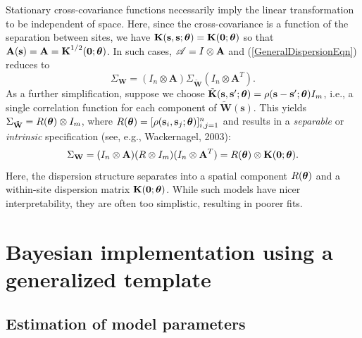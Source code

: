 \documentclass[a4paper]{article}
\newcommand{\btheta}{ \mbox{\boldmath $ \theta $} }
\newcommand{\bzero}{\textbf{0}}
\newcommand{\bA}{\textbf{A}}
\newcommand{\bK}{\textbf{K}}
\newcommand{\bs}{\textbf{s}}
\newcommand{\bW}{\textbf{W}}
\begin{document}
Stationary cross-covariance functions necessarily imply the linear
transformation to be independent of space. Here, since the
cross-covariance is a function of the separation between sites, we
have $\bK(\bs,\bs;\btheta) = \bK(\bzero;\btheta)$ so that
$\bA(\bs)=\bA=\bK^{1/2}(\bzero;\btheta)$. In such cases, ${\cal
A}=I\otimes \bA$ and (\ref{GeneralDispersionEqn}) reduces to
\begin{equation}\label{StationaryDispersionEqn} \Sigma_{\bW} =
(I_{n}\otimes \bA) \Sigma_{\tilde{\bW}} (I_n\otimes \bA^{T}).
\end{equation}
As a further simplification, suppose we choose
$\tilde{\bK}(\bs,\bs';\btheta)=\rho(\bs-\bs';\btheta)I_{m}$, i.e., a
single correlation function for each component of
$\tilde{\bW}(\bs)$. This yields $\Sigma_{\tilde{\bW}} =
R(\btheta)\otimes I_m$, where $R(\btheta) =
[\rho(\bs_i,\bs_j;\btheta)]_{i,j=1}^{n}$ and results in a
\emph{separable} or \emph{intrinsic} specification (see, e.g., Wackernagel, 2003):
\begin{equation}\label{StationaryDispersionEqn2}
\Sigma_{\bW} = (I_{n}\otimes \bA) (R\otimes I_{m}) (I_n\otimes
\bA^{T}) = R(\btheta) \otimes \bK(\bzero;\btheta).
\end{equation}
Here, the dispersion structure separates into a spatial component
$R(\btheta)$ and a within-site dispersion matrix
$\bK(\bzero;\btheta)$. While such models have nicer
interpretability, they are often too simplistic, resulting in poorer
fits.


\section{Bayesian implementation using a generalized template}\label{ggt}

\subsection{Estimation of model parameters}\label{estparams}
\end{document}
